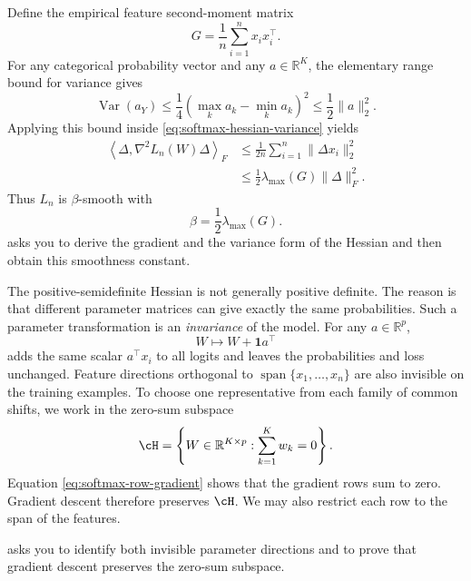 \documentclass[11pt,twoside]{article}
\newcommand{\R}{\mathbb R}
\newcommand{\spanop}{\operatorname{span}}
\theoremstyle{definition}
\theoremstyle{remark}
\begin{document}
Define the empirical feature second-moment matrix
\begin{equation}
 G=\frac1n\sum_{i=1}^n x_ix_i^\top.
 \label{eq:feature-gram}
\end{equation}
For any categorical probability vector and any $a\in\R^K$, the elementary
range bound for variance gives
\[
 \operatorname{Var}(a_Y)
 \le\frac14(\max_k a_k-\min_k a_k)^2
 \le\frac12\|a\|_2^2.
\]
Applying this bound inside \cref{eq:softmax-hessian-variance} yields
\begin{align*}
 \left\langle\Delta,\nabla^2L_n(W)\Delta\right\rangle_F
 &\le\frac1{2n}\sum_{i=1}^n\|\Delta x_i\|_2^2\\
 &\le\frac12\lambda_{\max}(G)\|\Delta\|_F^2.
\end{align*}
Thus $L_n$ is $\beta$-smooth with
\begin{equation}
 \beta=\frac12\lambda_{\max}(G).
 \label{eq:softmax-smoothness}
\end{equation}
 asks you to derive the gradient and the
variance form of the Hessian and then obtain this smoothness constant.

The positive-semidefinite Hessian is not generally positive definite. The
reason is that different parameter matrices can give exactly the same
probabilities. Such a parameter transformation is an \emph{invariance} of the
model. For any $a\in\R^p$,
\begin{equation}
 W\longmapsto W+\mathbf 1a^\top
 \label{eq:common-shift}
\end{equation}
adds the same scalar $a^\top x_i$ to all logits and leaves the probabilities
and loss unchanged. Feature directions orthogonal to
$\spanop\{x_1,\ldots,x_n\}$ are also invisible on the training examples. To
choose one representative from each family of common shifts, we work in the
zero-sum subspace
\begin{equation}
 \cH=\left\{W\in\R^{K\times p}:\sum_{k=1}^K w_k=0\right\}.
 \label{eq:gauge-subspace}
\end{equation}
Equation \cref{eq:softmax-row-gradient} shows that the gradient rows sum to
zero. Gradient descent therefore preserves $\cH$. We may also restrict each
row to the span of the features.

 asks you to identify both invisible
parameter directions and to prove that gradient descent preserves the zero-sum
subspace.
\end{document}
